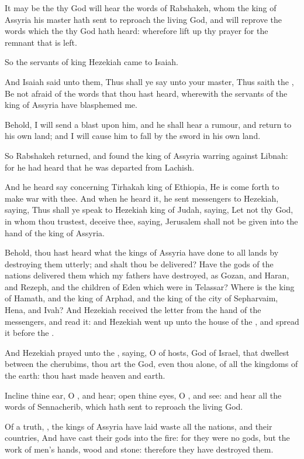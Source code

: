 \Verse It may be the \LORD thy God will hear the words of Rabshakeh, whom the king of Assyria his master hath sent to reproach the living God, and will reprove the words which the \LORD thy God hath heard: wherefore lift up thy prayer for the remnant that is left.

\Verse So the servants of king Hezekiah came to Isaiah.

\Verse And Isaiah said unto them, Thus shall ye say unto your master, Thus saith the \LORD, Be not afraid of the words that thou hast heard, wherewith the servants of the king of Assyria have blasphemed me.

\Verse Behold, I will send a blast upon him, and he shall hear a rumour, and return to his own land; and I will cause him to fall by the sword in his own land.

\Verse So Rabshakeh returned, and found the king of Assyria warring against Libnah: for he had heard that he was departed from Lachish.

\Verse And he heard say concerning Tirhakah king of Ethiopia, He is come forth to make war with thee. And when he heard it, he sent messengers to Hezekiah, saying, \Verse Thus shall ye speak to Hezekiah king of Judah, saying, Let not thy God, in whom thou trustest, deceive thee, saying, Jerusalem shall not be given into the hand of the king of Assyria.

\Verse Behold, thou hast heard what the kings of Assyria have done to all lands by destroying them utterly; and shalt thou be delivered?  \Verse Have the gods of the nations delivered them which my fathers have destroyed, as Gozan, and Haran, and Rezeph, and the children of Eden which were in Telassar?  \Verse Where is the king of Hamath, and the king of Arphad, and the king of the city of Sepharvaim, Hena, and Ivah?  \Verse And Hezekiah received the letter from the hand of the messengers, and read it: and Hezekiah went up unto the house of the \LORD, and spread it before the \LORD.

\Verse And Hezekiah prayed unto the \LORD, saying, \Verse O \LORD of hosts, God of Israel, that dwellest between the cherubims, thou art the God, even thou alone, of all the kingdoms of the earth: thou hast made heaven and earth.

\Verse Incline thine ear, O \LORD, and hear; open thine eyes, O \LORD, and see: and hear all the words of Sennacherib, which hath sent to reproach the living God.

\Verse Of a truth, \LORD, the kings of Assyria have laid waste all the nations, and their countries, \Verse And have cast their gods into the fire: for they were no gods, but the work of men's hands, wood and stone: therefore they have destroyed them.

